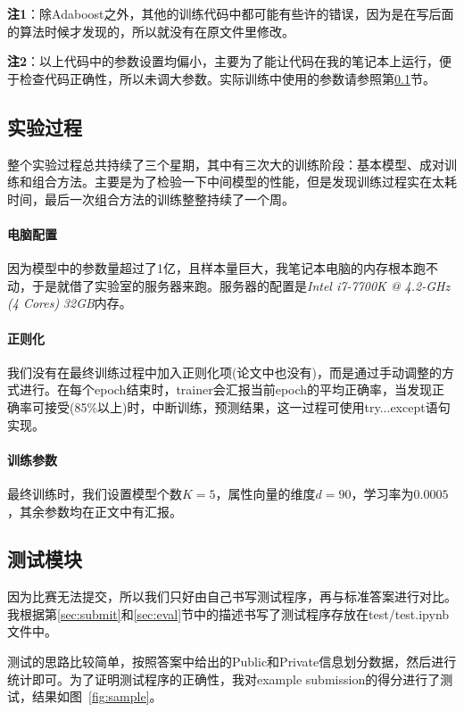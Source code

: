 \documentclass[12pt]{article} %
\begin{document}
\begin{sloppypar}
{\bf 注1}：除Adaboost之外，其他的训练代码中都可能有些许的错误，因为是在写后面的算法时候才发现的，所以就没有在原文件里修改。

{\bf 注2}：以上代码中的参数设置均偏小，主要为了能让代码在我的笔记本上运行，便于检查代码正确性，所以未调大参数。实际训练中使用的参数请参照第\ref{sec:train}节。


\subsection{实验过程}
\label{sec:train}

整个实验过程总共持续了三个星期，其中有三次大的训练阶段：基本模型、成对训练和组合方法。主要是为了检验一下中间模型的性能，但是发现训练过程实在太耗时间，最后一次组合方法的训练整整持续了一个周。

\paragraph{电脑配置} 
因为模型中的参数量超过了1亿，且样本量巨大，我笔记本电脑的内存根本跑不动，于是就借了实验室的服务器来跑。服务器的配置是\textit{Intel i7-7700K @ 4.2-GHz (4 Cores)} \textit{32GB}内存。

\paragraph{正则化}
我们没有在最终训练过程中加入正则化项(论文中也没有)，而是通过手动调整的方式进行。在每个epoch结束时，trainer会汇报当前epoch的平均正确率，当发现正确率可接受(85\%以上)时，中断训练，预测结果，这一过程可使用try...except语句实现。

\paragraph{训练参数}
最终训练时，我们设置模型个数$K=5$，属性向量的维度$d=90$，学习率为$0.0005$，其余参数均在正文中有汇报。

\subsection{测试模块}

因为比赛无法提交，所以我们只好由自己书写测试程序，再与标准答案进行对比。我根据第\ref{sec:submit}和\ref{sec:eval}节中的描述书写了测试程序存放在test/test.ipynb文件中。

测试的思路比较简单，按照答案中给出的Public和Private信息划分数据，然后进行统计即可。为了证明测试程序的正确性，我对example submission的得分进行了测试，结果如图~\ref{fig:sample}。


\end{sloppypar}
\end{document}
